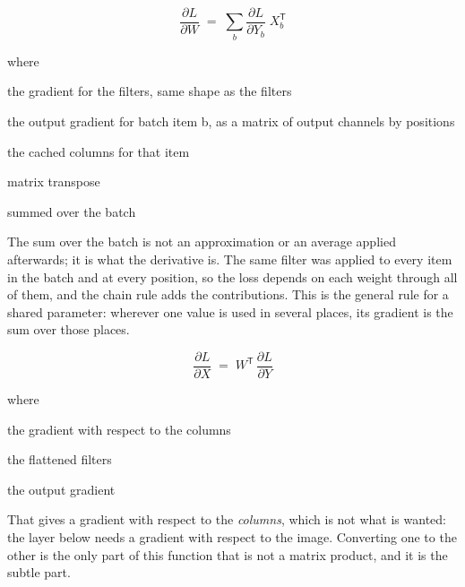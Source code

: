 
\begin{equation}
\frac{\partial L}{\partial W} \;=\; \sum_{b} \frac{\partial L}{\partial Y_b} \; X_b^{\mathsf{T}}
\end{equation}

\noindent where
\begin{description}[leftmargin=2.4em,style=nextline,font=\normalfont\ttfamily]\setlength\itemsep{1pt}
  \item[{$\frac{\partial L}{\partial W}$}] \normalfont the gradient for the filters, same shape as the filters
  \item[{$\frac{\partial L}{\partial Y_b}$}] \normalfont the output gradient for batch item b, as a matrix of output channels by positions
  \item[{$X_b$}] \normalfont the cached columns for that item
  \item[{${}^{\mathsf{T}}$}] \normalfont matrix transpose
  \item[{$\sum_b$}] \normalfont summed over the batch
\end{description}
The sum over the batch is not an approximation or an average applied afterwards; it is what the derivative is. The same filter was applied to every item in the batch and at every position, so the loss depends on each weight through all of them, and the chain rule adds the contributions. This is the general rule for a shared parameter: wherever one value is used in several places, its gradient is the sum over those places.



\begin{equation}
\frac{\partial L}{\partial X} \;=\; W^{\mathsf{T}} \, \frac{\partial L}{\partial Y}
\end{equation}

\noindent where
\begin{description}[leftmargin=2.4em,style=nextline,font=\normalfont\ttfamily]\setlength\itemsep{1pt}
  \item[{$\frac{\partial L}{\partial X}$}] \normalfont the gradient with respect to the columns
  \item[{$W$}] \normalfont the flattened filters
  \item[{$\frac{\partial L}{\partial Y}$}] \normalfont the output gradient
\end{description}
That gives a gradient with respect to the \emph{columns}, which is not what is wanted: the layer below needs a gradient with respect to the image. Converting one to the other is the only part of this function that is not a matrix product, and it is the subtle part.

